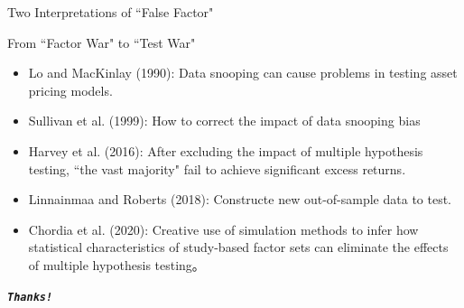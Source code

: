 \documentclass[UTF8, 16pt]{beamer}
\begin{document}
\begin{CJK*}{UTF8}{gbsn}
\begin{frame}{Two Interpretations of ``False Factor"}
\end{frame}
\begin{frame}{From ``Factor War" to ``Test War"}
	\begin{itemize}
		\item Lo and MacKinlay (1990): Data snooping can cause problems in testing asset pricing models.
		\item Sullivan et al. (1999): How to correct the impact of data snooping bias
		\item Harvey et al. (2016): After excluding the impact of multiple hypothesis testing, ``the vast majority" fail to achieve significant excess returns.
		\item Linnainmaa and Roberts (2018): Constructe new out-of-sample data to test.
		\item Chordia et al. (2020): Creative use of simulation methods to infer how statistical characteristics of study-based factor sets can eliminate the effects of multiple hypothesis testing。
	\end{itemize}
\end{frame}
\begin{frame}[allowframebreaks]%
	\begin{center}
		\Huge\textbf{\textit{\texttt{Thanks!}}}
	\end{center}
\end{frame}




\end{CJK*}
\end{document}
